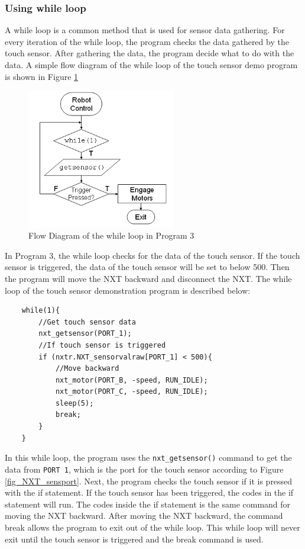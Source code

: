 \documentclass[12pt]{article}
\begin{document}
\subsubsection*{Using while loop}
A while loop is a common method that is used for sensor data gathering. For every iteration of the while loop, 
the program checks the data gathered by the touch sensor. After gathering the data, the program decide what to 
do with the data. A simple flow diagram of the while loop of the touch sensor demo program is shown in Figure 
\ref{fig_NXT_touchflow}

\begin{figure}[h]
  \begin{center}
    \includegraphics[height=2.4in]{figure/mindstorm/NXT_touchflow.png}
    \caption{Flow Diagram of the while loop in Program 3 \label{fig_NXT_touchflow}}
  \end{center}
\end{figure}

In Program 3, the while loop checks for the data of the touch sensor. If the touch sensor is triggered, 
the data of the touch sensor will be set to below 500. Then the program will move the NXT backward and 
disconnect the NXT. The while loop of the touch sensor demonstration program is described below:
\begin{verbatim}
    while(1){
        //Get touch sensor data
        nxt_getsensor(PORT_1);
        //If touch sensor is triggered
        if (nxtr.NXT_sensorvalraw[PORT_1] < 500){
            //Move backward
            nxt_motor(PORT_B, -speed, RUN_IDLE);
            nxt_motor(PORT_C, -speed, RUN_IDLE);
            sleep(5);
            break;
        }
    }
\end{verbatim}
In this while loop, the program uses the \verb+nxt_getsensor()+ command to get the data from \verb+PORT 1+, 
which is the port for the touch sensor according to Figure \ref{fig_NXT_sensport}. Next, the program checks 
the touch sensor if it is pressed with the if statement. If the touch sensor has been triggered, the codes 
in the if statement will run. The codes inside the if statement is the same command for moving the NXT 
backward. After moving the NXT backward, the command break allows the program to exit out of the while loop.
 This while loop will never exit until the touch sensor is triggered and the break command is used.
\end{document}
